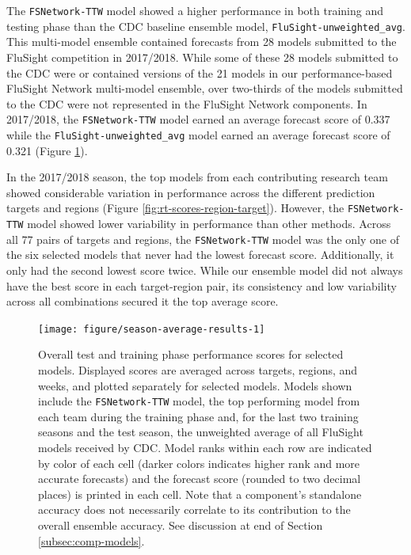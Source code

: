 \documentclass{article}\usepackage[]{graphicx}\usepackage[]{color}
\newenvironment{knitrout}{}{} %
\begin{document}
The {\tt FSNetwork-TTW} model showed a higher performance in both training and testing phase than the CDC baseline ensemble model, {\tt FluSight-unweighted\_avg}.
This multi-model ensemble contained forecasts from 28 models submitted to the FluSight competition in 2017/2018.
While some of these 28 models submitted to the CDC were or contained versions of the 21 models in our performance-based FluSight Network multi-model ensemble, over two-thirds of the models submitted to the CDC were not represented in the FluSight Network components.
In 2017/2018, the {\tt FSNetwork-TTW} model earned an average forecast score of
0.337 
while the {\tt FluSight-unweighted\_avg} model earned an average forecast score of
0.321 (Figure \ref{fig:season-average-results}).

In the 2017/2018 season, the top models from each contributing research team showed considerable variation in performance across the different prediction targets and regions (Figure \ref{fig:rt-scores-region-target}). 
However, the {\tt FSNetwork-TTW} model showed lower variability in performance than other methods. 
Across all 77 pairs of targets and regions, the {\tt FSNetwork-TTW} model was the only one of the six selected models that never had the lowest forecast score.
Additionally, it only had the second lowest score twice. 
While our ensemble model did not always have the best score in each target-region pair, its consistency and low variability across all combinations secured it the top average score.



\begin{knitrout}
\color{fgcolor}\begin{figure}
\texttt{[image: figure/season-average-results-1]} \caption{Overall test and training phase performance scores for selected models. Displayed scores are averaged across targets, regions, and weeks, and plotted separately for selected models. Models shown include the {\tt FSNetwork-TTW} model, the top performing model from each team during the training phase and, for the last two training seasons and the test season, the unweighted average of all FluSight models received by CDC. Model ranks within each row are indicated by color of each cell (darker colors indicates higher rank and more accurate forecasts) and the forecast score (rounded to two decimal places) is printed in each cell. Note that a component's standalone accuracy does not necessarily correlate to its contribution to the overall ensemble accuracy.  See discussion at end of Section \ref{subsec:comp-models}.}\label{fig:season-average-results}
\end{figure}


\end{knitrout}
\end{document}

